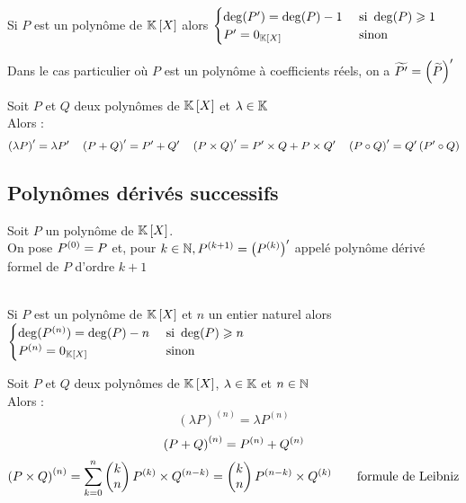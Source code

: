 \begin{defprop}
    ~\\
    Si \(P\) est un polynôme de \(\K\croch{X}\) alors \(\begin{cases}
        \deg(P') = \deg(P) -1 &\text{ si } \deg(P) \geq 1\\
        P' = 0_{\K \croch{X}} & \text{ sinon }
    \end{cases}\)
\end{defprop}
\begin{defprop}
    Dans le cas particulier où \(P\) est un polynôme à coefficients réels, on a \(\wt{P'} = \paren{\wt{P}}'\)
\end{defprop}
\begin{defprop}
    Soit \(P\) et \(Q\) deux polynômes de \(\K \croch{X}\) et \(\lambda \in \K\)\\
    Alors : 
    \[\paren{ \lambda P}' = \lambda P' \quad \paren{P + Q}' = P' + Q' \quad \paren{P \times Q}' = P' \times Q + P \times Q' \quad \paren{P \circ Q}' = Q' \paren{P' \circ Q}\]
\end{defprop}

\subsection{Polynômes dérivés successifs}
\begin{defi}
    Soit \(P\) un polynôme de \(\K \croch{X}\).\\
    On pose \(P^{\paren{0}} = P\) et, pour \(k \in \N, P ^{\paren{k+1}} = \paren{ P ^{\paren{k}}}'\) appelé polynôme dérivé formel de \(P\) d’ordre \(k + 1\)
\end{defi}

\begin{defprop}
    ~\\
    Si \(P\) est un polynôme de \(\K \croch{X}\) et \(n\) un entier naturel alors \(\begin{cases}
        \deg(P^{(n)}) = \deg(P)-n &\text{ si } \deg(P) \geq n \\
        P ^{(n)} = 0_{\K \croch{X}} & \text{ sinon}
    \end{cases}\)
\end{defprop}

\begin{defprop}
    Soit \(P\) et \(Q\) deux polynômes de \(\K \croch{X}\), \(\lambda \in \K\) et \(n \in \N\)\\
    Alors : 
    \[(\lambda P)^{(n)} = \lambda P ^{(n)}\]
    \[\paren{P + Q} ^{(n)} = P^{(n)} + Q^{(n)}\]
    \[\paren{P \times Q}^{(n)} = \sum_{k=0}^n \binom{n}{k} P ^{(k)} \times Q ^{(n-k)} = \binom{n}{k} P ^{(n-k)} \times Q ^{(k)}\qquad \text{formule de Leibniz}\] 
\end{defprop}

